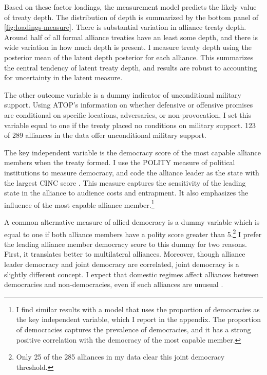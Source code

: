 \documentclass[12pt]{article}
\begin{document}
Based on these factor loadings, the measurement model predicts the likely value of treaty depth. 
The distribution of depth is summarized by the bottom panel of \autoref{fig:loadings-measure}. 
There is substantial variation in alliance treaty depth. 
Around half of all formal alliance treaties have an least some depth, and there is wide variation in how much depth is present.
I measure treaty depth using the posterior mean of the latent depth posterior for each alliance. 
This summarizes the central tendency of latent treaty depth, and results are robust to accounting for uncertainty in the latent measure. 


The other outcome variable is a dummy indicator of unconditional military support. 
Using ATOP's information on whether defensive or offensive promises are conditional on specific locations, adversaries, or non-provocation, I set this variable equal to one if the treaty placed no conditions on military support.
123 of 289 alliances in the data offer unconditional military support. 


The key independent variable is the democracy score of the most capable alliance members when the treaty formed. 
I use the POLITY measure of political institutions to measure democracy, and code the alliance leader as the state with the largest CINC score \citep{SingerCINC1988}.
This measure captures the sensitivity of the leading state in the alliance to audience costs and entrapment.
It also emphasizes the influence of the most capable alliance member.\footnote{I find similar results with a model that uses the proportion of democracies as the key independent variable, which I report in the appendix. The proportion of democracies captures the prevalence of democracies, and it has a strong positive correlation with the democracy of the most capable member.}    


A common alternative measure of allied democracy is a dummy variable which is equal to one if both alliance members have a polity score greater than 5.\footnote{Only 25 of the 285 alliances in my data clear this joint democracy threshold.}
I prefer the leading alliance member democracy score to this dummy for two reasons.
First, it translates better to multilateral alliances. 
Moreover, though alliance leader democracy and joint democracy are correlated, joint democracy is a slightly different concept. 
I expect that domestic regimes affect alliances between democracies and non-democracies, even if such alliances are unusual \citep{Leeds1999}.
\end{document}
